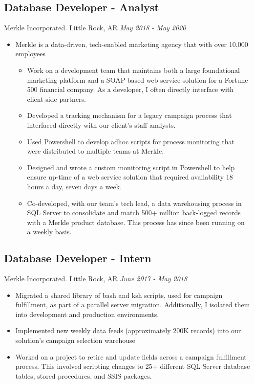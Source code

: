 \documentclass[11pt]{article}
\begin{document}
\subsection*{Database Developer - Analyst}
Merkle Incorporated. Little Rock, AR \hfill \textit{May 2018 - May 2020} \\
\begin{itemize}
\item Merkle is a data-driven, tech-enabled marketing agency that with over 10,000 employees
 \begin{itemize}
   \item Work on a development team that maintains both a large foundational marketing platform and a SOAP-based web service solution for a Fortune 500 financial company. As a developer, I often directly interface with client-side partners.
   \item Developed a tracking mechanism for a legacy campaign process that interfaced directly with our client's staff analysts.
   \item Used Powershell to develop adhoc scripts for process monitoring that were distributed to multiple teams at Merkle.
   \item Designed and wrote a custom monitoring script in Powershell to help ensure up-time of a web service solution that required availability 18 hours a day, seven days a week.
   \item Co-developed, with our team's tech lead, a data warehousing process in SQL Server to consolidate and match 500+ million back-logged records with a Merkle product database. This process has since been running on a weekly basis.
 \end{itemize}
\end{itemize}

\subsection*{Database Developer - Intern}
Merkle Incorporated. Little Rock, AR \hfill \textit{June 2017 - May 2018} \\
\begin{itemize}
 \item Migrated a shared library of bash and ksh scripts, used for campaign fulfillment, as part of a parallel server migration. Additionally, I isolated them into development and production environments.
 \item Implemented new weekly data feeds (approximately 200K records) into our solution's campaign selection warehouse
 \item Worked on a project to retire and update fields across a campaign fulfillment process. This involved scripting changes to 25+ different SQL Server database tables, stored procedures, and SSIS packages.
\end{itemize}
\end{document}
